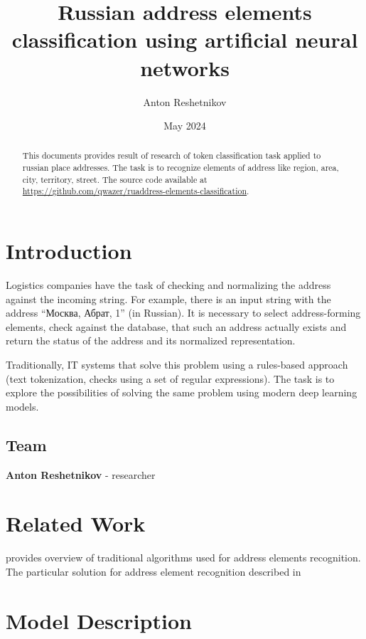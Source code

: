 \documentclass{article}
\title{Russian address elements classification using artificial neural networks}
\author{Anton Reshetnikov}
\date{May 2024}
\begin{document}
\maketitle
\begin{abstract}
    This documents provides result of research of token classification task applied to russian place addresses.
    The task is to recognize elements of address like region, area, city, territory, street.
    The source code available at
     \url{https://github.com/qwazer/ruaddress-elements-classification}.
\end{abstract}



\section{Introduction}


Logistics companies have the task of checking and normalizing the address against the incoming string.
For example, there is an input string with the address ``Москва, Абрат, 1'' (in Russian).
It is necessary to select address-forming elements, check against the database,
that such an address actually exists and return the status of the address and its normalized representation.

Traditionally, IT systems that solve this problem using a rules-based approach (text tokenization, checks using a set of regular expressions).
The task is to explore the possibilities of solving the same problem using modern deep learning models.

\subsection{Team}

\textbf{Anton Reshetnikov} - researcher



\section{Related Work}
\label{sec:related}
\cite{makarov2020algo} provides overview of traditional algorithms used for address elements recognition.
The particular solution for address element recognition described in ~\cite{habr2020gar}

\section{Model Description}
\end{document}
